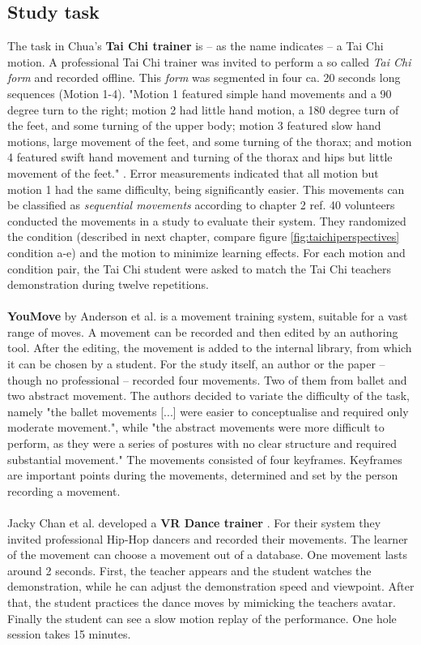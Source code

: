 \subsection{Study task}
The task in Chua's \cite{Chua2003} \textbf{Tai Chi trainer} is \--- as the name indicates \--- a Tai Chi motion. A professional Tai Chi trainer was invited to perform a so called \textit{Tai Chi form} and recorded offline. This \textit{form} was segmented in four ca. 20 seconds long sequences (Motion 1-4). "Motion 1 featured simple hand movements and a 90 degree turn to the right; motion 2 had little hand motion, a 180 degree turn of the feet, and some turning of the upper body; motion 3 featured slow hand motions, large movement of the feet, and some turning of the thorax; and motion 4 featured swift hand movement and turning of the thorax and hips but little movement of the feet." \cite{Chua2003}. Error measurements indicated that all motion but motion 1 had the same difficulty, being significantly easier. This movements can be classified as \textit{sequential movements} according to chapter 2 \todo ref. 40 volunteers conducted the movements in a study to evaluate their system. They randomized the condition (described in next chapter, compare figure \ref{fig:taichiperspectives} condition a-e) and the motion to minimize learning effects. For each motion and condition pair, the Tai Chi student were asked to match the Tai Chi teachers demonstration during twelve repetitions.\\ \\
\textbf{YouMove} by Anderson et al. \cite{Anderson2013a} is a movement training system, suitable for a vast range of moves. A movement can be recorded and then edited by an authoring tool. After the editing, the movement is added to the internal library, from which it can be chosen by a student. For the study itself, an author or the paper \--- though no professional \--- recorded four movements. Two of them from ballet and two abstract movement. The authors decided to variate the difficulty of the task, namely "the ballet movements [...] were easier to conceptualise and required only moderate movement.", while "the abstract movements were more difficult to perform, as they were a series of postures with no clear structure and required substantial movement." The movements consisted of four keyframes. Keyframes are important points during the movements, determined and set by the person recording a movement.\\ \\
Jacky Chan et al. developed a \textbf{VR Dance trainer} \cite{Chan2011a}. For their system they invited professional Hip-Hop dancers and recorded their movements. The learner of the movement can choose a movement out of a database. One movement lasts around 2 seconds. First, the teacher appears and the student watches the demonstration, while he can adjust the demonstration speed and viewpoint. After that, the student practices the dance moves by mimicking the teachers avatar. Finally the student can see a slow motion replay of the performance. One hole session takes 15 minutes.\\ \\
